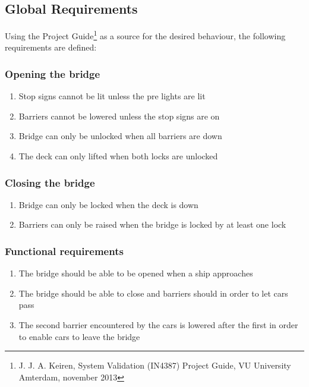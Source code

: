 \subsection{Global Requirements}
\label{sec:glob}

Using the Project Guide\footnote{J. J. A. Keiren, System Validation (IN4387)
Project Guide, VU University Amterdam, november 2013} as a source for the
desired behaviour, the following requirements are defined:

\subsubsection*{Opening the bridge}
\begin{enumerate}
	\item Stop signs cannot be lit unless the pre lights are lit
	\item Barriers cannot be lowered unless the stop signs are on
	\item Bridge can only be unlocked when all barriers are down
	\item The deck can only lifted when both locks are unlocked
	\setcounter{enumTemp}{\theenumi}
\end{enumerate}

\subsubsection*{Closing the bridge}
\begin{enumerate}
	\setcounter{enumi}{\theenumTemp}
	\item Bridge can only be locked when the deck is down
	\item Barriers can only be raised when the bridge is locked by at least one
	      lock
	\setcounter{enumTemp}{\theenumi}
\end{enumerate}

\subsubsection*{Functional requirements}
\begin{enumerate}
	\setcounter{enumi}{\theenumTemp}
	\item The bridge should be able to be opened when a ship approaches
	\item The bridge should be able to close and barriers should in order to
	      let cars pass
	\item The second barrier encountered by the cars is lowered after
	      the first in order to enable cars to leave the bridge
	\setcounter{enumTemp}{\theenumi}
\end{enumerate}

